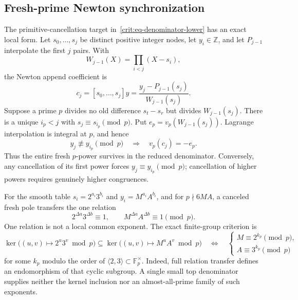 \documentclass[11pt,oneside]{article}
\theoremstyle{definition}
\theoremstyle{remark}
\newcommand{\Z}{\mathbb Z}
\begin{document}
\subsection{Fresh-prime Newton synchronization}
\label{crit:fresh-prime}

The primitive-cancellation target in~\eqref{crit:eq-denominator-lower} has an exact local
form.  Let $s_0,\ldots,s_j$ be distinct positive integer nodes, let $y_i\in\Z$, and let
$P_{j-1}$ interpolate the first $j$ pairs.  With
\[
 W_{j-1}(X)=\prod_{i<j}(X-s_i),
\]
the Newton append coefficient is
\begin{equation}
 c_j=[s_0,\ldots,s_j]y
 =\frac{y_j-P_{j-1}(s_j)}{W_{j-1}(s_j)}.
 \label{crit:eq-newton-append}
\end{equation}
Suppose a prime $p$ divides no old difference $s_t-s_r$ but divides
$W_{j-1}(s_j)$.  There is a unique $i_p<j$ with $s_j\equiv s_{i_p}\pmod p$.  Put
$e_p=v_p(W_{j-1}(s_j))$.  Lagrange interpolation is integral at $p$, and hence
\begin{equation}
 y_j\not\equiv y_{i_p}\pmod p
 \quad\Longrightarrow\quad
 v_p(c_j)=-e_p.
 \label{crit:eq-fresh-pole}
\end{equation}
Thus the entire fresh $p$-power survives in the reduced denominator.  Conversely, any
cancellation of its first power forces $y_j\equiv y_{i_p}\pmod p$; cancellation of higher
powers requires genuinely higher congruences.

For the smooth table $s_i=2^{a_i}3^{b_i}$ and $y_i=M^{a_i}A^{b_i}$, and for
$p\nmid6MA$, a canceled fresh pole transfers the one relation
\begin{equation}
 2^{\Delta a}3^{\Delta b}\equiv1,\qquad
 M^{\Delta a}A^{\Delta b}\equiv1\pmod p.
 \label{crit:eq-one-local-transfer}
\end{equation}
One relation is not a local common exponent.  The exact finite-group criterion is
\begin{equation}
 \ker\bigl((u,v)\mapsto2^u3^v\bmod p\bigr)
 \subseteq
 \ker\bigl((u,v)\mapsto M^uA^v\bmod p\bigr)
 \quad\Longleftrightarrow\quad
 \begin{cases}
 M\equiv2^{k_p}\pmod p,\\
 A\equiv3^{k_p}\pmod p
 \end{cases}
 \label{crit:eq-local-common-exponent}
\end{equation}
for some $k_p$ modulo the order of $\langle2,3\rangle\subset\mathbb F_p^\times$.  Indeed, full
relation transfer defines an endomorphism of that cyclic subgroup.  A single small top
denominator supplies neither the kernel inclusion nor an almost-all-prime family of such
exponents.
\end{document}
